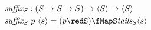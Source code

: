 \documentclass[preview]{standalone}
\begin{document}
\begin{align*}%
    \mathit{suffix_S} &: (S \rightarrow S \rightarrow S) \rightarrow \vect{S} \rightarrow \vect{S}\\
    \mathit{suffix_S} &\ p\ \vect{s} = (p \redS) \fMapS \mathit{tails_S} \vect{s}%
\end{align*}
\end{document}
